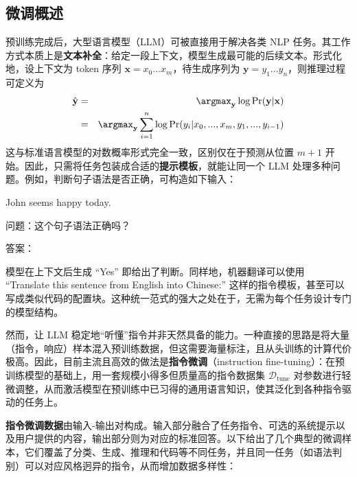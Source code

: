 \subsection{微调概述}

\noindent 预训练完成后，大型语言模型（LLM）可被直接用于解决各类 NLP 任务。其工作方式本质上是\textbf{文本补全}：给定一段上下文，模型生成最可能的后续文本。形式化地，设上下文为 token 序列 $\mathbf{x}=x_0...x_m$，待生成序列为 $\mathbf{y}=y_1...y_n$，则推理过程可定义为
\begin{eqnarray}
\hat{\mathbf{y}} & = & \argmax_{\mathbf{y}} \log \Pr(\mathbf{y} | \mathbf{x}) \nonumber \\
                 & = & \argmax_{\mathbf{y}} \sum_{i=1}^{n} \log \Pr(y_i|x_0,...,x_m,y_1,...,y_{i-1}) \label{eq:inf}
\end{eqnarray}
这与标准语言模型的对数概率形式完全一致，区别仅在于预测从位置 $m+1$ 开始。因此，只需将任务包装成合适的\textbf{提示模板}，就能让同一个 LLM 处理多种问题。例如，判断句子语法是否正确，可构造如下输入：

\vspace{0.5em}
\begin{tcolorbox}
\hspace{4em} John seems happy today.

\hspace{4em} 问题：这个句子语法正确吗？

\hspace{4em} 答案：\underline{\hspace{2em}}
\end{tcolorbox}
\vspace{0.5em}

模型在上下文后生成 ``Yes'' 即给出了判断。同样地，机器翻译可以使用 ``Translate this sentence from English into Chinese:'' 这样的指令模板，甚至可以写成类似代码的配置块。这种统一范式的强大之处在于，无需为每个任务设计专门的模型结构。

然而，让 LLM 稳定地“听懂”指令并非天然具备的能力。一种直接的思路是将大量（指令，响应）样本混入预训练数据，但这需要海量标注，且从头训练的计算代价极高。因此，目前主流且高效的做法是\textbf{指令微调}（instruction fine-tuning）：在预训练模型的基础上，用一套规模小得多但质量高的指令数据集 $\mathcal{D}_{\text{tune}}$ 对参数进行轻微调整，从而激活模型在预训练中已习得的通用语言知识，使其泛化到各种指令驱动的任务上。

\textbf{指令微调数据}由输入-输出对构成。输入部分融合了任务指令、可选的系统提示以及用户提供的内容，输出部分则为对应的标准回答。以下给出了几个典型的微调样本，它们覆盖了分类、生成、推理和代码等不同任务，并且同一任务（如语法判别）可以对应风格迥异的指令，从而增加数据多样性：

